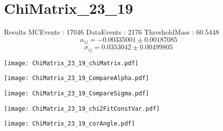 \documentclass[a4paper,12pt]{article}
\begin{document}
\section{ChiMatrix\_23\_19}
\begin{minipage}{0.49\linewidth} Results \newline
MCEvents : 17046\newline
DataEvents : 2176 \newline
ThresholdMass : 60.5448\\
$$\alpha_{ij} = -0.00335001\pm 0.00187085$$
$$\sigma_{ij} = 0.0353042\pm 0.00499805$$
\end{minipage}\hfill
\begin{minipage}{0.49\linewidth} 
\texttt{[image: ChiMatrix\_23\_19\_chiMatrix.pdf]}\\
\end{minipage}
\hfill
\begin{minipage}{0.49\linewidth} 
\texttt{[image: ChiMatrix\_23\_19\_CompareAlpha.pdf]}\\
\end{minipage}
\hfill
\begin{minipage}{0.49\linewidth} 
\texttt{[image: ChiMatrix\_23\_19\_CompareSigma.pdf]}\\
\end{minipage}
\begin{minipage}{0.49\linewidth} 
\texttt{[image: ChiMatrix\_23\_19\_chi2FitConstVar.pdf]}\\
\end{minipage}
\hfill
\begin{minipage}{0.49\linewidth} 
\texttt{[image: ChiMatrix\_23\_19\_corAngle.pdf]}\\
\end{minipage}
\end{document}
